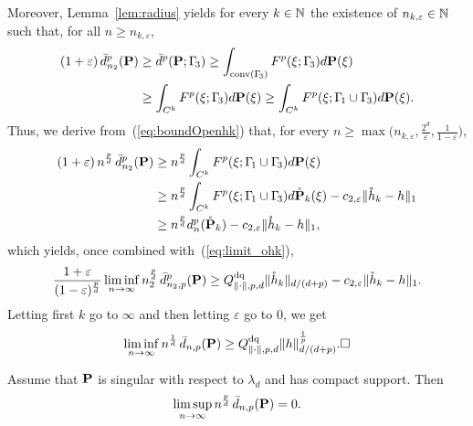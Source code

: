 Moreover, Lemma~\ref{lem:radius} yields for every $k\in\mathbb{N}$ the existence of
$n_{k,\varepsilon}\in\mathbb{N}$ such that, for all $n\geq n_{k,\varepsilon}$,
\begin{eqnarray*}
\begin{split}
 (1+\varepsilon)\, \bar d_{n_2}^p(\mathbf{P}) & \geq \bar d^p(\mathbf{P}; \Gamma_{\!3})
 \geq \int_{\operatorname{conv}(\Gamma_{\!3})} F^p(\xi; \Gamma_{\!3}) d\mathbf{P}(\xi)\\
  & \geq \int_{C^k}
  F^p(\xi; \Gamma_{\!3}) d\mathbf{P}(\xi) \geq \int_{C^k}
  F^p(\xi; \Gamma_{\!1} \cup \Gamma_{\!3}) d\mathbf{P}(\xi).
\end{split}
\end{eqnarray*}
Thus, we derive from~(\ref{eq:boundOpenhk}) that, for every $n\geq
\max\Big(n_{k,\varepsilon}, \frac{2^d}{\varepsilon}, \frac{1}{1-\varepsilon} \Big)$,
\begin{eqnarray*}
\begin{split}
  (1+\varepsilon)\,n^{\frac pd}\, \bar d_{n_2}^p(\mathbf{P}) & \geq n^{\frac pd}
  \int_{C^k} F^p(\xi; \Gamma_{\!1} \cup \Gamma_{\!3}) d\mathbf{P}(\xi)  \\
  & \geq n^{\frac pd} \int_{C^k}  F^p(\xi; \Gamma_{\!1} \cup \Gamma_{\!3})
  d\mathring {\mathbf{P}}_k(\xi) - c_{2,\varepsilon} \lVert\mathring h_k - h\rVert_1\\
  & \geq n^{\frac pd} d_n^p(\mathring {\mathbf{P}}_k) - c_{2,\varepsilon} \lVert\mathring h_k -
  h\rVert_1,
\end{split}
\end{eqnarray*}
which yields, once  combined with~(\ref{eq:limit_ohk}),
\[
\frac{1+\varepsilon}{(1-\varepsilon)^{\frac pd}} \liminf_{n\to\infty} n_2^{\frac pd} \, \bar
d_{n_2,p}^p(\mathbf{P}) \geq  Q^{\text{dq}}_{\lVert\cdot\rVert, p, d} \lVert\mathring h_k\rVert_{d/(d+p)}- c_{2,\varepsilon}
\lVert\mathring h_k - h\rVert_1.
\]
Letting first $k$ go to $\infty$ and then letting $\varepsilon$ go to $0$, we get
\[
\limin n^{\frac 1d} \, \Dqbpn(\Probb) \geq  \Qpn
\normdp{h}^{\frac 1p}.\hfill \Box
\]

\begin{prop}\label{prop:rateSingular}
Assume that $\mathbf{P}$ is singular with respect to $\lambda_d$ and has compact
support. Then
 \[
  \limsup_{n\to\infty} n^{\frac pd}\, \bar d_{n,p}(\mathbf{P}) = 0.
 \]

\end{prop}

